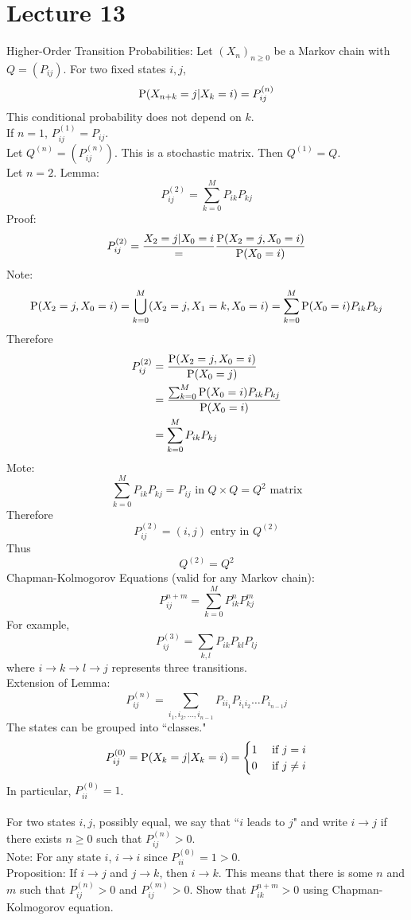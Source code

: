 \documentclass[12pt]{article}
\begin{document}
\section{Lecture 13} 
Higher-Order Transition Probabilities: Let $(X_n)_{n\geq 0}$ be a Markov chain with $Q = (P_{ij})$. For two fixed states $i,j$, $$\mathrm{P}( X_{n+k} = j | X_k=i ) = P_{ij}^{(n)} $$ 
This conditional probability does not depend on $k$. \\
If $n=1$, $P_{ij}^{(1)} = P_{ij}$. \\
Let $Q^{(n)} = (P_{ij}^{(n)})$. This is a stochastic matrix. Then $Q^{(1)} = Q$. \\
Let $n=2$. Lemma: $$P_{ij}^{(2)} = \sum_{k=0}^M P_{ik}P_{kj} $$ 
Proof: $$ P_{ij}^{(2)} = \frac{X_2 = j | X_0 = i} = \frac{\mathrm{P}( X_2 = j, X_0 = i )}{\mathrm{P}( X_0=i )} $$ 
Note: $$\mathrm{P}( X_2=j,X_0=i ) = \bigcup_{k=0}^M (X_2 = j, X_1 = k,X_0 = i) = \sum_{k=0}^M \mathrm{P}( X_0 = i )P_{ik}P_{kj} $$ 
Therefore $$ \begin{aligned} P_{ij}^{(2)} &= \frac{\mathrm{P}( X_2 = j,X_0=i )}{\mathrm{P}( X_0=j )} \\ &= \frac{\sum_{k=0}^M \mathrm{P}( X_0 = i ) P_{ik}P_{kj}}{\mathrm{P}( X_0=i )} \\ &= \sum_{k=0}^M P_{ik}P_{kj} \end{aligned} $$ 
Mote: $$\sum_{k=0}^M P_{ik}P_{kj} = P_{ij} \text{ in } Q \times Q = Q^2 \text{ matrix} $$
Therefore $$P_{ij}^{(2)} = (i,j) \text{ entry in } Q^{(2)} $$ 
Thus $$Q^{(2)} = Q^2 $$ 
Chapman-Kolmogorov Equations (valid for any Markov chain): $$ P_{ij}^{n+m} = \sum_{k=0}^M P_{ik}^{n}P_{kj}^{m} $$ 
For example, $$P_{ij}^{(3)} = \sum_{k,l} P_{ik}P_{kl}P_{lj} $$ where $i \to k \to l \to j$ represents three transitions. \\
Extension of Lemma: $$ P_{ij}^{(n)} = \sum_{i_1,i_2,\dots,i_{n-1}} P_{ii_1}P_{i_1i_2}\dots P_{i_{n-1}j} $$ 
The states can be grouped into ``classes." 
$$P_{ij}^{(0)} = \mathrm{P}( X_k = j | X_k = i )= \begin{cases} 1 &\text{ if } j=i \\ 0 &\text{ if } j \neq i \end{cases}$$ 
In particular, $P_{ii}^{(0)} = 1$. \\~\\
For two states $i,j$, possibly equal, we say that ``$i$ leads to $j$" and write $i \to j$ if there exists $n\geq0$ such that $P_{ij}^{(n)} > 0$. \\
Note: For any state $i$, $i \to i$ since $P_{ii}^{(0)} = 1 > 0$. \\
Proposition: If $i\to j$ and $j \to k$, then $i \to k$. This means that there is some $n$ and $m$ such that $P_{ij}^{(n)} > 0$ and $P_{ij}^{(m)} > 0$. Show that $P_{ik}^{n+m} > 0$ using Chapman-Kolmogorov equation. \\~\\
\end{document}
